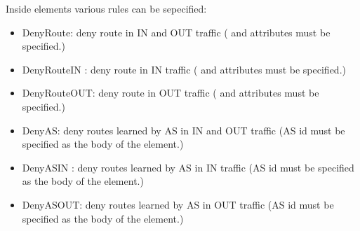 Inside  elements various rules can be sepecified:
\begin{itemize}
  \item DenyRoute: deny route in IN and OUT traffic ( and
         attributes must be specified.)
  \item DenyRouteIN : deny route in IN traffic ( and
         attributes must be specified.)
  \item DenyRouteOUT: deny route in OUT traffic ( and
         attributes must be specified.)
  \item DenyAS: deny routes learned by AS in IN  and OUT traffic (AS id must be
        specified as the body of the element.)
  \item DenyASIN : deny routes learned by AS in IN traffic (AS id must be
        specified as the body of the element.)
  \item DenyASOUT: deny routes learned by AS in OUT traffic (AS id must be
        specified as the body of the element.)
\end{itemize}


